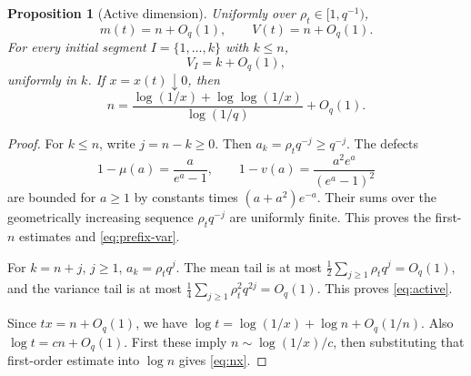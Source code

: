 \documentclass[11pt,a4paper]{article}
\numberwithin{equation}{section}
\newtheorem{proposition}[proposition]{Proposition}
\theoremstyle{definition}
\theoremstyle{remark}
\begin{document}
\begin{proposition}[Active dimension]\label{prop:active}
Uniformly over $\rho_t\in[1,q^{-1})$,
\begin{equation}\label{eq:active}
 m(t)=n+O_q(1),\qquad V(t)=n+O_q(1).
\end{equation}
For every initial segment
$I=\{1,\ldots,k\}$ with $k\le n$,
\begin{equation}\label{eq:prefix-var}
 V_I=k+O_q(1),
\end{equation}
uniformly in $k$. If $x=x(t)\downarrow0$, then
\begin{equation}\label{eq:nx}
 n=\frac{\log(1/x)+\log\log(1/x)}{\log(1/q)}+O_q(1).
\end{equation}
\end{proposition}
\begin{proof}
For $k\le n$, write $j=n-k\ge0$. Then $a_k=\rho_tq^{-j}\ge q^{-j}$.
The defects
\[
 1-\mu(a)=\frac{a}{e^a-1},\qquad
 1-v(a)=\frac{a^2e^a}{(e^a-1)^2}
\]
are bounded for $a\ge1$ by constants times $(a+a^2)e^{-a}$.
Their sums over the geometrically increasing sequence
$\rho_tq^{-j}$ are uniformly finite. This proves the first-$n$
estimates and \cref{eq:prefix-var}.

For $k=n+j$, $j\ge1$, $a_k=\rho_tq^j$. The mean tail is at most
$\frac12\sum_{j\ge1}\rho_tq^j=O_q(1)$, and the variance tail is
at most $\frac14\sum_{j\ge1}\rho_t^2q^{2j}=O_q(1)$.
This proves \cref{eq:active}.

Since $tx=n+O_q(1)$, we have
$\log t=\log(1/x)+\log n+O_q(1/n)$.
Also $\log t=cn+O_q(1)$. First these imply
$n\sim\log(1/x)/c$, then substituting that first-order estimate
into $\log n$ gives \cref{eq:nx}.
\end{proof}
\end{document}
